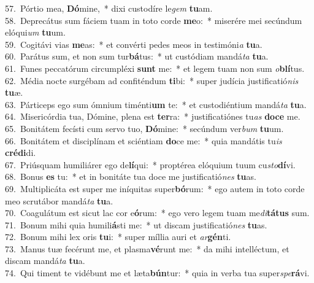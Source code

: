 {57.~}Pórtio mea, \textbf{Dó}mine,~* dixi custodíre le\textit{gem} \textbf{tu}am.\\
{58.~}Deprecátus sum fáciem tuam in toto corde \textbf{me}o:~* miserére mei secúndum elóqui\textit{um} \textbf{tu}um.\\
{59.~}Cogitávi vias \textbf{me}as:~* et convérti pedes meos in testimóni\textit{a} \textbf{tu}a.\\
{60.~}Parátus sum, et non sum tur\textbf{bá}tus:~* ut custódiam mandá\textit{ta} \textbf{tu}a.\\
{61.~}Funes peccatórum circumpléxi \textbf{sunt} me:~* et legem tuam non sum \textit{o}\textbf{blí}tus.\\
{62.~}Média nocte surgébam ad confiténdum \textbf{ti}bi:~* super judícia justificatió\textit{nis} \textbf{tu}æ.\\
{63.~}Párticeps ego sum ómnium timénti\textbf{um} te:~* et custodiéntium mandá\textit{ta} \textbf{tu}a.\\
{64.~}Misericórdia tua, Dómine, plena est \textbf{ter}ra:~* justificatiónes tu\textit{as} \textbf{do}\textbf{ce} me.\\
{65.~}Bonitátem fecísti cum servo tuo, \textbf{Dó}mine:~* secúndum ver\textit{bum} \textbf{tu}um.\\
{66.~}Bonitátem et disciplínam et sciéntiam \textbf{do}ce me:~* quia mandátis tu\textit{is} \textbf{cré}\textbf{di}di.\\
{67.~}Priúsquam humiliárer ego de\textbf{lí}qui:~* proptérea elóquium tuum cu\textit{sto}\textbf{dí}vi.\\
{68.~}Bonus \textbf{es} tu:~* et in bonitáte tua doce me justificatió\textit{nes} \textbf{tu}as.\\
{69.~}Multiplicáta est super me iníquitas super\textbf{bó}rum:~* ego autem in toto corde meo scrutábor mandá\textit{ta} \textbf{tu}a.\\
{70.~}Coagulátum est sicut lac cor e\textbf{ó}rum:~* ego vero legem tuam me\textit{di}\textbf{tá}\textbf{tus} sum.\\
{71.~}Bonum mihi quia humili\textbf{á}sti me:~* ut discam justificatió\textit{nes} \textbf{tu}as.\\
{72.~}Bonum mihi lex oris \textbf{tu}i:~* super míllia auri et \textit{ar}\textbf{gén}ti.\\
{73.~}Manus tuæ fecérunt me, et plasma\textbf{vé}runt me:~* da mihi intelléctum, et discam mandá\textit{ta} \textbf{tu}a.\\
{74.~}Qui timent te vidébunt me et læta\textbf{bún}tur:~* quia in verba tua super\textit{spe}\textbf{rá}vi.\\
